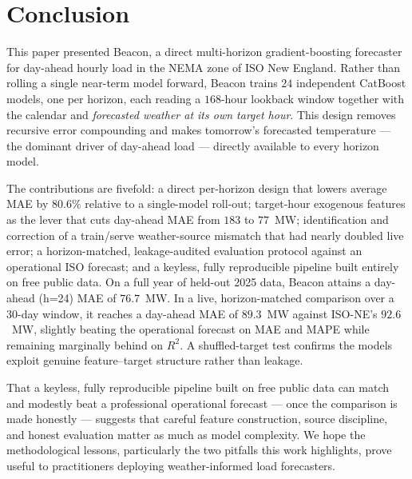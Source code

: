 \section{Conclusion}\label{sec:conclusion}

This paper presented Beacon, a direct multi-horizon gradient-boosting forecaster for
day-ahead hourly load in the NEMA zone of ISO New England. Rather than rolling a
single near-term model forward, Beacon trains $24$ independent CatBoost models, one per
horizon, each reading a $168$-hour lookback window together with the calendar and
\emph{forecasted weather at its own target hour}. This design removes recursive error
compounding and makes tomorrow's forecasted temperature --- the dominant driver of
day-ahead load --- directly available to every horizon model.

The contributions are fivefold: a direct per-horizon design that lowers average MAE by
$80.6\%$ relative to a single-model roll-out; target-hour exogenous features as the
lever that cuts day-ahead MAE from $183$ to $77$~MW; identification and correction of a
train/serve weather-source mismatch that had nearly doubled live error; a
horizon-matched, leakage-audited evaluation protocol against an operational ISO
forecast; and a keyless, fully reproducible pipeline built entirely on free public data. On a full year of held-out 2025 data, Beacon attains a day-ahead (h=24) MAE
of $76.7$~MW. In a live, horizon-matched comparison over a $30$-day window, it reaches
a day-ahead MAE of $89.3$~MW against ISO-NE's $92.6$~MW, slightly beating the
operational forecast on MAE and MAPE while remaining marginally behind on $R^2$. A
shuffled-target test confirms the models exploit genuine feature--target structure
rather than leakage.

That a keyless, fully reproducible pipeline built on free public data can match and
modestly beat a professional operational forecast --- once the comparison is made
honestly --- suggests that careful feature construction, source discipline, and honest
evaluation matter as much as model complexity. We hope the methodological lessons,
particularly the two pitfalls this work highlights, prove useful to practitioners
deploying weather-informed load forecasters.

